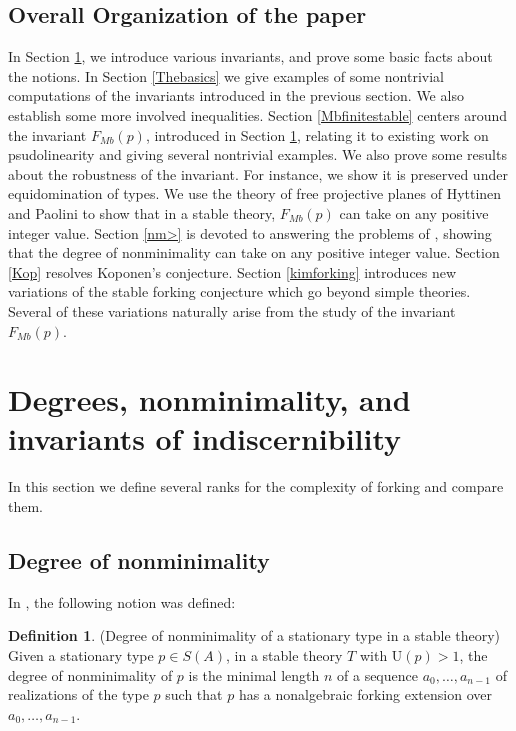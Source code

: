 \documentclass[11pt]{amsart}
\newcommand{\Fmb}[1]{F_{Mb}\left( #1  \right)}
\theoremstyle{definition}
\newtheorem{definition}[theorem]{Definition}
\theoremstyle{remark}
\newcommand{\U}{\mathrm{U} }
\numberwithin{equation}{section}
\begin{document}
\subsection{Overall Organization of the paper}
In Section \ref{nmdegfmb}, we introduce various invariants, and prove some basic facts about the notions. In Section \ref{Thebasics} we give examples of some nontrivial computations of the invariants introduced in the previous section. We also establish some more involved inequalities. Section \ref{Mbfinitestable} centers around the invariant $\Fmb p$, introduced in Section \ref{nmdegfmb}, relating it to existing work on psudolinearity and giving several nontrivial examples. We also prove some results about the robustness of the invariant. For instance, we show it is preserved under equidomination of types. We use the theory of free projective planes of Hyttinen and Paolini \cite{HP21} to show that in a stable theory, $\Fmb p$ can take on any positive integer value. Section \ref{nm>} is devoted to answering the problems of \cite{freitag2023degree, freitag2023bounding}, showing that the degree of nonminimality can take on any positive integer value.
Section \ref{Kop} resolves Koponen's conjecture. Section \ref{kimforking} introduces new variations of the stable forking conjecture which go beyond simple theories. Several of these variations naturally arise from the study of the invariant $\Fmb p$.  





\section{Degrees, nonminimality, and invariants of indiscernibility}\label{nmdegfmb}

In this section we  define several ranks for the complexity of forking
and compare them.

\subsection{Degree of nonminimality}


In \cite{freitag2023bounding}, the following notion was defined: 
\begin{definition} \label{RahimJim}
(Degree of nonminimality of a stationary type in a stable theory) Given a stationary type $p \in S(A)$, in a stable theory $T$ with $\U (p) >1$, the degree of nonminimality of $p$ is the minimal length $n$ of a sequence $a_0, \ldots , a_{n-1}$ of realizations of the type $p$ such that $p$ has a nonalgebraic forking extension over $a_0, \ldots , a_{n-1}$. 
\end{definition}
\end{document}
